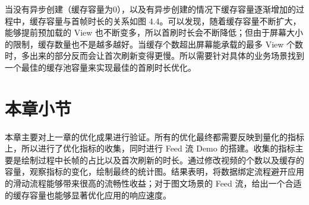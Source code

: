 

当没有异步创建（缓存容量为0），以及有异步创建的情况下缓存容量逐渐增加的过程中，缓存容量与首帧时长的关系如图 4.4。可以发现，随着缓存容量不断扩大，能够提前预加载的 View 也不断变多，所以首刷时长会不断降低；但由于屏幕大小的限制，缓存数量也不是越多越好。当缓存个数超出屏幕能承载的最多 View 个数时，多出来的部分反而会让首次刷新变得更慢。所以需要针对具体的业务场景找到一个最佳的缓存池容量来实现最佳的首刷时长优化。

\section{本章小节}

本章主要对上一章的优化成果进行验证。所有的优化最终都需要反映到量化的指标上，所以进行了优化指标的收集，同时进行 Feed 流 Demo 的搭建。收集的指标主要是绘制过程中长帧的占比以及首次刷新的时长。通过修改视频的个数以及缓存的容量，观察指标的变化，绘制最终的统计图。结果表明，将数据绑定流程避开应用的滑动流程能够带来很高的流畅性收益；对于图文场景的 Feed 流，给出一个合适的缓存容量也能够显著优化应用的响应速度。
